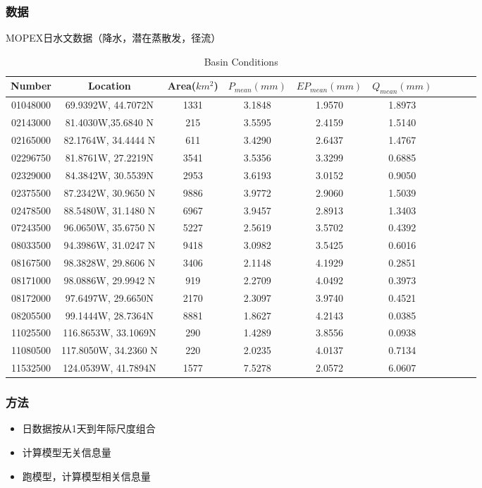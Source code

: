 \documentclass{beamer}
\begin{document}
\begin{CJK}{UTF8}{gkai}
\begin{frame}
\frametitle{数据}
MOPEX日水文数据（降水，潜在蒸散发，径流）
\begin{table}[H] \tiny
\caption{Basin Conditions} 
\begin{center}
\begin{tabular}{cccccccccc}
\toprule
Number &Location& Area($km^2$)& $P_{mean}(mm)$& $EP_{mean}(mm)$&  $Q_{mean}(mm)$  \\
\midrule
01048000&69.9392W, 44.7072N& 1331   & 3.1848  &  1.9570  &  1.8973\\
 02143000&81.4030W,35.6840 N& 215    & 3.5595  &  2.4159 &   1.5140\\
  02165000&82.1764W, 34.4444 N& 611   & 3.4290  &  2.6437  &  1.4767\\
02296750&81.8761W, 27.2219N& 3541   &
3.5356 &   3.3299   & 0.6885\\
02329000&84.3842W, 30.5539N& 2953 &
3.6193 &   3.0152 &   0.9050\\   
02375500 &87.2342W, 30.9650 N& 9886   & 3.9772  &  2.9060   & 1.5039\\
02478500  &88.5480W, 31.1480 N& 6967  & 3.9457  &  2.8913  &  1.3403\\
07243500 &96.0650W, 35.6750 N& 5227  & 2.5619  &  3.5702  &  0.4392\\
 08033500 &94.3986W, 31.0247 N& 9418   & 3.0982  &  3.5425   & 0.6016\\
08167500 &98.3828W, 29.8606  N& 3406   & 2.1148   & 4.1929  &  0.2851\\
  08171000& 98.0886W, 29.9942 N& 919  & 2.2709  &  4.0492  &  0.3973\\
08172000&97.6497W, 29.6650N& 2170   & 2.3097  &  3.9740  &  0.4521\\
08205500&99.1444W, 28.7364N& 8881   & 1.8627  &  4.2143 &   0.0385\\
 11025500& 116.8653W, 33.1069N& 290  & 1.4289  &  3.8556  &  0.0938\\
11080500&117.8050W, 34.2360 N&  220 & 2.0235 &   4.0137   & 0.7134\\
11532500&124.0539W, 41.7894N& 1577   & 7.5278  &  2.0572  &  6.0607\\
\bottomrule
\end{tabular}
\end{center}
\end{table}
\end{frame}
\begin{frame}
\frametitle{方法}
\begin{itemize}
\item 日数据按从1天到年际尺度组合
\item 计算模型无关信息量
\item 跑模型，计算模型相关信息量
\end{itemize}
\end{frame}



\end{CJK}
\end{document}
